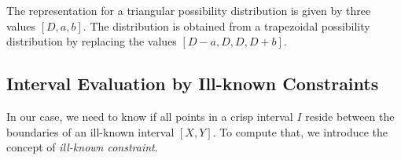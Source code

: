 The representation for a triangular possibility distribution is given by three values $\left[D,a,b \right]$. The distribution is obtained from a trapezoidal possibility distribution by replacing the values $\left[D-a, D, D, D+b \right]$.


% 
% 
% 

%  



\subsection{\label{subsec:interval-evaluation-by-ill-known-constraints}Interval Evaluation by Ill-known Constraints}
In our case, we need to know if all points in a crisp interval $I$ reside between the boundaries of an ill-known interval $\left[ X , Y \right]$. To compute that, we introduce the concept of \emph{ill-known constraint}\cite{Pons2011}.




